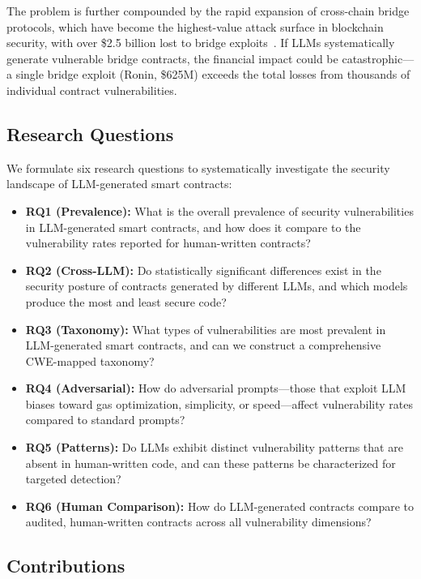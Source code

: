 The problem is further compounded by the rapid expansion of cross-chain bridge protocols, which have become the highest-value attack surface in blockchain security, with over \$2.5 billion lost to bridge exploits~\cite{bridge_hacks}. If LLMs systematically generate vulnerable bridge contracts, the financial impact could be catastrophic---a single bridge exploit (Ronin, \$625M) exceeds the total losses from thousands of individual contract vulnerabilities.

\subsection{Research Questions}

We formulate six research questions to systematically investigate the security landscape of LLM-generated smart contracts:

\begin{itemize}[leftmargin=*]
    \item \textbf{RQ1 (Prevalence):} What is the overall prevalence of security vulnerabilities in LLM-generated smart contracts, and how does it compare to the vulnerability rates reported for human-written contracts?
    \item \textbf{RQ2 (Cross-LLM):} Do statistically significant differences exist in the security posture of contracts generated by different LLMs, and which models produce the most and least secure code?
    \item \textbf{RQ3 (Taxonomy):} What types of vulnerabilities are most prevalent in LLM-generated smart contracts, and can we construct a comprehensive CWE-mapped taxonomy?
    \item \textbf{RQ4 (Adversarial):} How do adversarial prompts---those that exploit LLM biases toward gas optimization, simplicity, or speed---affect vulnerability rates compared to standard prompts?
    \item \textbf{RQ5 (Patterns):} Do LLMs exhibit distinct vulnerability patterns that are absent in human-written code, and can these patterns be characterized for targeted detection?
    \item \textbf{RQ6 (Human Comparison):} How do LLM-generated contracts compare to audited, human-written contracts across all vulnerability dimensions?
\end{itemize}

\subsection{Contributions}

